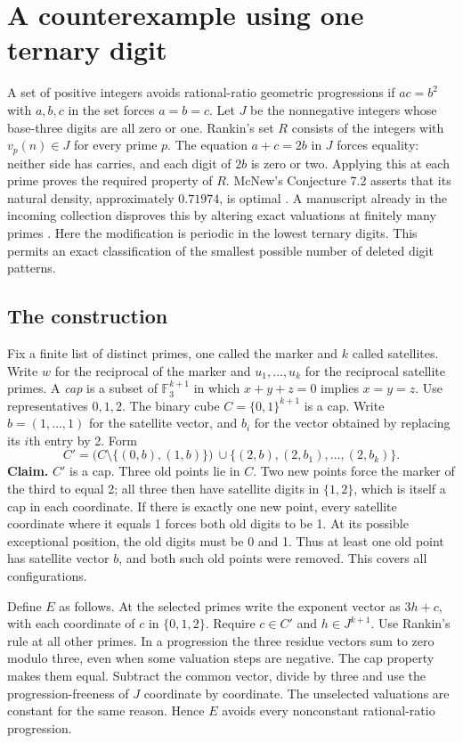 \section{A counterexample using one ternary digit}\label{sec:cap}
A set of positive integers avoids rational-ratio geometric progressions if $ac=b^2$ with $a,b,c$ in the set forces $a=b=c$. Let $J$ be the nonnegative integers whose base-three digits are all zero or one. Rankin's set $R$ consists of the integers with $v_p(n)\in J$ for every prime $p$. The equation $a+c=2b$ in $J$ forces equality: neither side has carries, and each digit of $2b$ is zero or two. Applying this at each prime proves the required property of $R$. McNew's Conjecture 7.2 asserts that its natural density, approximately $0.71974$, is optimal \cite{mcnew}. A manuscript already in the incoming collection disproves this by altering exact valuations at finitely many primes \cite{incomingmc}. Here the modification is periodic in the lowest ternary digits. This permits an exact classification of the smallest possible number of deleted digit patterns.

\subsection{The construction}
Fix a finite list of distinct primes, one called the marker and $k$ called satellites. Write $w$ for the reciprocal of the marker and $u_1,\ldots,u_k$ for the reciprocal satellite primes. A \emph{cap} is a subset of $\mathbb F_3^{k+1}$ in which $x+y+z=0$ implies $x=y=z$. Use representatives $0,1,2$. The binary cube $C=\{0,1\}^{k+1}$ is a cap. Write $b=(1,\ldots,1)$ for the satellite vector, and $b_i$ for the vector obtained by replacing its $i$th entry by 2. Form
\[
 C'=\bigl(C\setminus\{(0,b),(1,b)\}\bigr)\ \cup \{(2,b),(2,b_1),\ldots,(2,b_k)\}.
\]
\textbf{Claim.} $C'$ is a cap. Three old points lie in $C$. Two new points force the marker of the third to equal 2; all three then have satellite digits in $\{1,2\}$, which is itself a cap in each coordinate. If there is exactly one new point, every satellite coordinate where it equals 1 forces both old digits to be 1. At its possible exceptional position, the old digits must be 0 and 1. Thus at least one old point has satellite vector $b$, and both such old points were removed. This covers all configurations.

Define $E$ as follows. At the selected primes write the exponent vector as $3h+c$, with each coordinate of $c$ in $\{0,1,2\}$. Require $c\in C'$ and $h\in J^{k+1}$. Use Rankin's rule at all other primes. In a progression the three residue vectors sum to zero modulo three, even when some valuation steps are negative. The cap property makes them equal. Subtract the common vector, divide by three and use the progression-freeness of $J$ coordinate by coordinate. The unselected valuations are constant for the same reason. Hence $E$ avoids every nonconstant rational-ratio progression.

